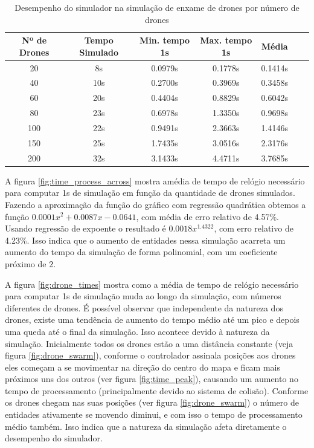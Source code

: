 \begin{table}
    \begin{tabular}{ccccccc}
        \toprule
        Nº de Drones &  Tempo Simulado &  Min. tempo 1s &  Max. tempo 1s &  Média \\
        \midrule
        20  &                8s &       0.0979s &       0.1778s &  0.1414s \\
        40  &               10s &       0.2700s &       0.3969s &  0.3458s \\
        60  &               20s &       0.4404s &       0.8829s &  0.6042s \\
        80  &               23s &       0.6978s &       1.3350s &  0.9698s \\
        100 &               22s &       0.9491s &       2.3663s &  1.4146s \\
        150 &               25s &       1.7435s &       3.0516s &  2.3176s \\
        200 &               32s &       3.1433s &       4.4711s &  3.7685s \\
        \bottomrule
    \end{tabular}
    \caption{Desempenho do simulador na simulação de enxame de drones por número de drones}
    \label{table:performance} 
\end{table}

A figura \ref{fig:time_process_across} mostra amédia de tempo de relógio necessário para computar 1s de simulação em função da quantidade de drones simulados. Fazendo a aproximação da função do gráfico com regressão quadrática obtemos a função $0.0001x^2+0.0087x-0.0641$, com média de erro relativo de 4.57\%. Usando regressão de expoente o resultado é $0.0018x^{1.4322}$, com erro relativo de 4.23\%. Isso indica que o aumento de entidades nessa simulação acarreta um aumento do tempo da simulação de forma polinomial, com um coeficiente próximo de 2.

A figura \ref{fig:drone_times} mostra como a média de tempo de relógio necessário para computar 1s de simulação muda ao longo da simulação, com números diferentes de drones. É possível observar que independente da natureza dos drones, existe uma tendência de aumento do tempo médio até um pico e depois uma queda até o final da simulação. Isso acontece devido à natureza da simulação. Inicialmente todos os drones estão a uma distância constante (veja figura \ref{fig:drone_swarm}), conforme o controlador assinala posições aos drones eles começam a se movimentar na direção do centro do mapa e ficam mais próximos uns dos outros (ver figura \ref{fig:time_peak}), causando um aumento no tempo de processamento (principalmente devido ao sistema de colisão). Conforme os drones chegam nas suas posições (ver figura \ref{fig:drone_swarm}) o número de entidades ativamente se movendo diminui, e com isso o tempo de processamento médio também. Isso indica que a natureza da simulação afeta diretamente o desempenho do simulador.

